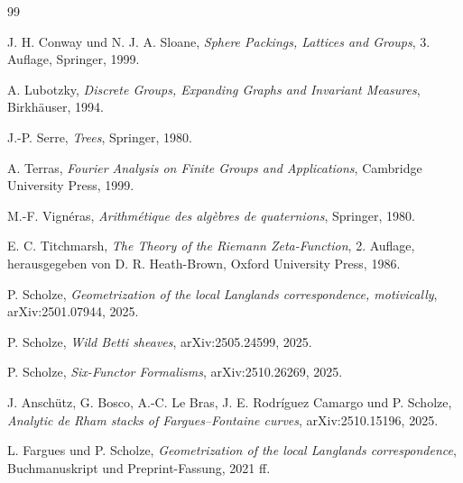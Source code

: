 \documentclass[12pt,a4paper]{article}
\theoremstyle{plain}
\theoremstyle{definition}
\theoremstyle{remark}
\begin{document}
\begin{thebibliography}{99}

J. H. Conway und N. J. A. Sloane,
\emph{Sphere Packings, Lattices and Groups},
3. Auflage, Springer, 1999.

A. Lubotzky,
\emph{Discrete Groups, Expanding Graphs and Invariant Measures},
Birkhäuser, 1994.

J.-P. Serre,
\emph{Trees},
Springer, 1980.

A. Terras,
\emph{Fourier Analysis on Finite Groups and Applications},
Cambridge University Press, 1999.

M.-F. Vignéras,
\emph{Arithmétique des algèbres de quaternions},
Springer, 1980.

E. C. Titchmarsh,
\emph{The Theory of the Riemann Zeta-Function},
2. Auflage, herausgegeben von D. R. Heath-Brown, Oxford University Press, 1986.

P. Scholze,
\emph{Geometrization of the local Langlands correspondence, motivically},
arXiv:2501.07944, 2025.

P. Scholze,
\emph{Wild Betti sheaves},
arXiv:2505.24599, 2025.

P. Scholze,
\emph{Six-Functor Formalisms},
arXiv:2510.26269, 2025.

J. Anschütz, G. Bosco, A.-C. Le Bras, J. E. Rodríguez Camargo und P. Scholze,
\emph{Analytic de Rham stacks of Fargues--Fontaine curves},
arXiv:2510.15196, 2025.

L. Fargues und P. Scholze,
\emph{Geometrization of the local Langlands correspondence},
Buchmanuskript und Preprint-Fassung, 2021 ff.

\end{thebibliography}
\end{document}
